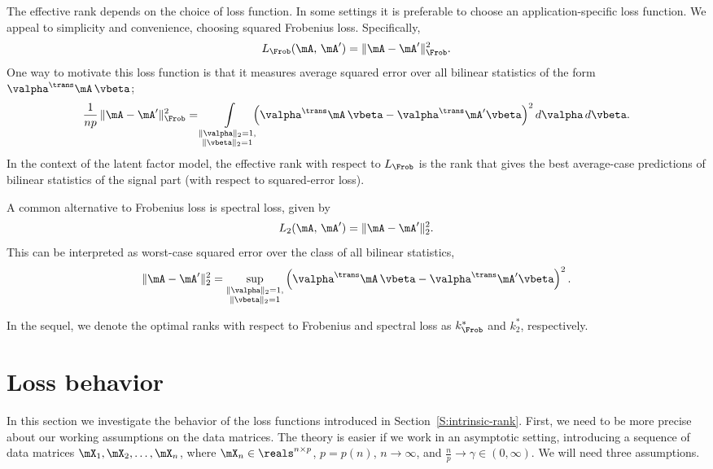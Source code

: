 The effective rank depends on the choice of loss function.  In some settings it is preferable to choose an application-specific loss function.  We appeal to simplicity and convenience, choosing squared Frobenius loss.  Specifically,
\[
    L_\Frob ( \mA, \, \mA' )
        = \| \mA - \mA' \|_\Frob^2.
\]
One way to motivate this loss function is that it measures average squared error over all bilinear statistics of the form 
$\valpha^\trans \mA \, \vbeta$;
\[
    \frac{1}{np} \,
    \| \mA - \mA' \|_\Frob^2
    =
    \int\limits_{ \substack{ \| \valpha \|_2 = 1, \\
                             \| \vbeta \|_2  = 1 } }
        \!\!\!\!
        \left(
            \valpha^\trans \mA \, \vbeta
            -
            \valpha^\trans \mA' \vbeta
        \right)^2
        d\valpha \,
        d\vbeta.
\]
In the context of the latent factor model, the effective rank with respect
to $L_\Frob$ is the rank that gives the best average-case predictions of 
bilinear statistics of the signal part (with respect to squared-error loss). 

A common alternative to Frobenius loss is spectral loss, given by
\[
    L_2 ( \mA, \, \mA' )
        = \| \mA - \mA' \|_2^2.
\]
This can be interpreted as worst-case squared error over the class of all 
bilinear statistics,
\[
    \| \mA - \mA' \|_2^2
        =
            \sup_{ \substack{ \| \valpha \|_2 = 1, \\
                              \| \vbeta \|_2  = 1 } }
                \left(
                    \valpha^\trans \mA \, \vbeta
                    -
                    \valpha^\trans \mA' \vbeta
                \right)^2.
\]

In the sequel, we denote the optimal ranks with respect to Frobenius and
spectral loss as $k^\ast_\Frob$ and $k^\ast_2$, respectively.


\section{Loss behavior}

In this section we investigate the behavior of the loss functions introduced
in Section~\ref{S:intrinsic-rank}.  First, we need to be more precise about
our working assumptions on the data matrices.  The theory is easier if we
work in an asymptotic setting, introducing a sequence of data matrices
$\mX_1, \mX_2, \ldots, \mX_n$, where $\mX_n \in \reals^{n \times p}$, $p = p(n)$, $n \to \infty$, and $\frac{n}{p} \to \gamma \in (0,\infty)$.  We
will need three assumptions.

